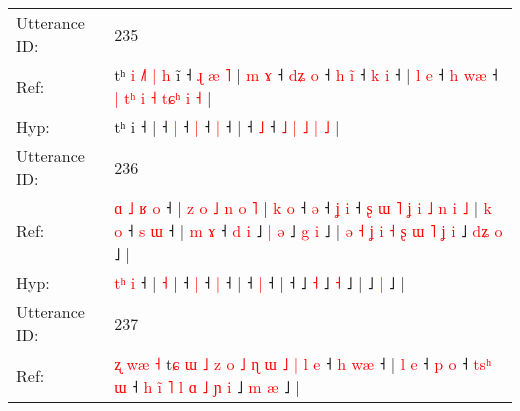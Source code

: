 \documentclass[10pt]{article}
\DeclareRobustCommand{\hl}[1]{{\textcolor{red}{#1}}}
\begin{document}
\begin{longtable}{ll}
 \\
\midrule
Utterance ID: & 235 \\
Ref: & tʰ\hl{ }\hl{i}\hl{ }\hl{˩}\hl{˥}\hl{ }\hl{|}\hl{ }\hl{h} i\hl{̃} ˧\hl{ }\hl{ɻ}\hl{ }\hl{æ}\hl{ }\hl{˥} |\hl{ }\hl{m}\hl{ }\hl{ɤ} ˧\hl{ }\hl{d}\hl{ʑ} \hl{o} ˧\hl{ }\hl{h} \hl{i}\hl{̃} ˧\hl{ }\hl{k} \hl{i} ˧ |\hl{ }\hl{l}\hl{ }\hl{e} ˧\hl{ }\hl{h} \hl{w}\hl{æ} ˧\hl{ }\hl{|}\hl{ }\hl{t}\hl{ʰ} \hl{i} \hl{˧} \hl{t}\hl{ɕ}\hl{ʰ} \hl{i} \hl{˧} |
 \\
Hyp: & tʰ\hl{}\hl{}\hl{}\hl{}\hl{}\hl{}\hl{}\hl{}\hl{} i\hl{} ˧\hl{}\hl{}\hl{}\hl{}\hl{}\hl{} |\hl{}\hl{}\hl{}\hl{} ˧\hl{}\hl{}\hl{} \hl{|} ˧\hl{}\hl{} \hl{}\hl{|} ˧\hl{}\hl{} \hl{|} ˧ |\hl{}\hl{}\hl{}\hl{} ˧\hl{}\hl{} \hl{}\hl{˩} ˧\hl{}\hl{}\hl{}\hl{}\hl{} \hl{˩} \hl{|} \hl{}\hl{}\hl{˩} \hl{|} \hl{˩} |
 \\
\midrule
Utterance ID: & 236 \\
Ref: & \hl{ɑ}\hl{ }\hl{˩}\hl{ }\hl{ʁ} \hl{o} ˧ |\hl{ }\hl{z}\hl{ }\hl{o}\hl{ }\hl{˩}\hl{ }\hl{n}\hl{ }\hl{o} \hl{˥} |\hl{ }\hl{k}\hl{ }\hl{o} ˧ \hl{ə} ˧\hl{ }\hl{ʝ} \hl{i} ˧\hl{ }\hl{ʂ}\hl{ }\hl{ɯ}\hl{ }\hl{˥}\hl{ }\hl{ʝ}\hl{ }\hl{i}\hl{ }\hl{˩}\hl{ }\hl{n}\hl{ }\hl{i}\hl{ }\hl{˩} |\hl{ }\hl{k}\hl{ }\hl{o} ˧\hl{ }\hl{s} \hl{ɯ} ˧ |\hl{ }\hl{m}\hl{ }\hl{ɤ} ˧\hl{ }\hl{d}\hl{ }\hl{i} ˩\hl{ }\hl{|} \hl{ə} ˩\hl{ }\hl{g} \hl{i} ˩ |\hl{ }\hl{ə}\hl{ }\hl{˧}\hl{ }\hl{ʝ}\hl{ }\hl{i}\hl{ }\hl{˧}\hl{ }\hl{ʂ}\hl{ }\hl{ɯ}\hl{ }\hl{˥}\hl{ }\hl{ʝ}\hl{ }\hl{i} ˩\hl{ }\hl{d}\hl{ʑ} \hl{o} ˩ |
 \\
Hyp: & \hl{}\hl{}\hl{}\hl{t}\hl{ʰ} \hl{i} ˧ |\hl{}\hl{}\hl{}\hl{}\hl{}\hl{}\hl{}\hl{}\hl{}\hl{} \hl{˧} |\hl{}\hl{}\hl{}\hl{} ˧ \hl{|} ˧\hl{}\hl{} \hl{|} ˧\hl{}\hl{}\hl{}\hl{}\hl{}\hl{}\hl{}\hl{}\hl{}\hl{}\hl{}\hl{}\hl{}\hl{}\hl{}\hl{}\hl{}\hl{} |\hl{}\hl{}\hl{}\hl{} ˧\hl{}\hl{} \hl{|} ˧ |\hl{}\hl{}\hl{}\hl{} ˧\hl{}\hl{}\hl{}\hl{} ˩\hl{}\hl{} \hl{˧} ˩\hl{}\hl{} \hl{˧} ˩ |\hl{}\hl{}\hl{}\hl{}\hl{}\hl{}\hl{}\hl{}\hl{}\hl{}\hl{}\hl{}\hl{}\hl{}\hl{}\hl{}\hl{}\hl{}\hl{}\hl{} ˩\hl{}\hl{}\hl{} \hl{|} ˩ |
 \\
\midrule
Utterance ID: & 237 \\
Ref: & \hl{ʐ}\hl{ }\hl{w}\hl{æ}\hl{ }\hl{˧}\hl{ }t\hl{ɕ}\hl{ }\hl{ɯ}\hl{ }\hl{˩}\hl{ }\hl{z}\hl{ }\hl{o}\hl{ }\hl{˩}\hl{ }\hl{ɳ}\hl{ }\hl{ɯ}\hl{ }\hl{˩}\hl{ }\hl{|}\hl{ }\hl{l} \hl{e} ˧\hl{ }\hl{h} \hl{w}\hl{æ} ˧ |\hl{ }\hl{l}\hl{ }\hl{e} ˧\hl{ }\hl{p} \hl{o} ˧\hl{ }\hl{t}\hl{s}\hl{ʰ} \hl{ɯ} ˧\hl{ }\hl{h}\hl{ }\hl{i}\hl{̃}\hl{ }\hl{˥}\hl{ }\hl{l}\hl{ }\hl{ɑ}\hl{ }\hl{˩}\hl{ }\hl{ɲ} \hl{i} ˩\hl{ }\hl{m} \hl{æ} ˩ |
 \\

\end{longtable}
\end{document}

